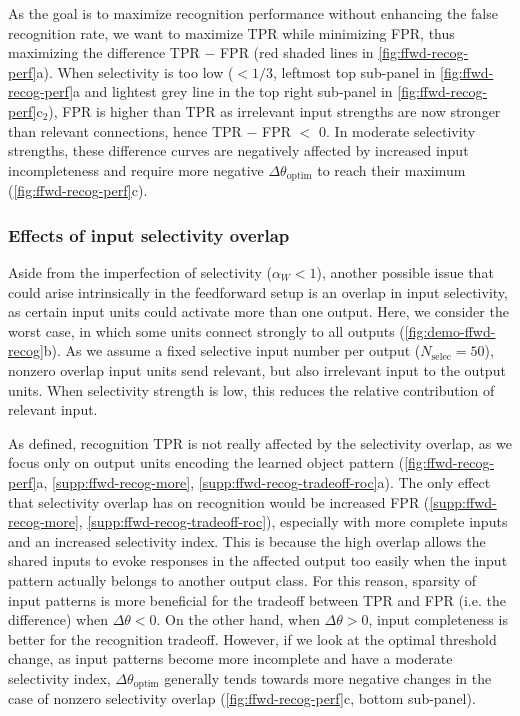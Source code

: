 As the goal is to maximize recognition performance without enhancing the false recognition rate,
        we want to maximize TPR while minimizing FPR,
        thus maximizing the difference TPR $-$ FPR
        (red shaded lines in \autoref{fig:ffwd-recog-perf}a).
    When selectivity is too low
        ($ < 1/3$, leftmost top sub-panel in \autoref{fig:ffwd-recog-perf}a
        and lightest grey line in the top right sub-panel in \autoref{fig:ffwd-recog-perf}c$_2$),
        FPR is higher than TPR as irrelevant input strengths are now stronger than relevant connections,
        hence TPR $-$ FPR $<$ 0.
    In moderate selectivity strengths, these difference curves are negatively affected by increased input incompleteness
        and require more negative $\Delta \theta_{\mathrm{optim}}$ to reach their maximum (\autoref{fig:ffwd-recog-perf}c).

\subsubsection*{Effects of input selectivity overlap}

Aside from the imperfection of selectivity ($\alpha_W < 1$),
        another possible issue that could arise intrinsically in the feedforward setup is
        an overlap in input selectivity, as certain input units could activate more than one output.
    Here, we consider the worst case, in which some units connect strongly to all outputs (\autoref{fig:demo-ffwd-recog}b).
    As we assume a fixed selective input number per output ($N_{\text{selec}} = 50$),
        nonzero overlap input units send relevant,
        but also irrelevant input to the output units.
    When selectivity strength is low, this reduces the relative contribution of relevant input.

As defined, recognition TPR is not really affected by the selectivity overlap,
        as we focus only on output units encoding the learned object pattern
        (\autoref{fig:ffwd-recog-perf}a,
        \autoref{supp:ffwd-recog-more},
        \autoref{supp:ffwd-recog-tradeoff-roc}a).
    The only effect that selectivity overlap has on recognition would be increased FPR
        (\autoref{supp:ffwd-recog-more},
        \autoref{supp:ffwd-recog-tradeoff-roc}),
        especially with more complete inputs and an increased selectivity index.
    This is because the high overlap allows the shared inputs
        to evoke responses in the affected output too easily
        when the input pattern actually belongs to another output class.
    For this reason, sparsity of input patterns is more beneficial
        for the tradeoff between TPR and FPR (i.e. the difference) when $\Delta \theta < 0$.
    On the other hand, when $\Delta \theta > 0$, input completeness is better for the recognition tradeoff.
    However, if we look at the optimal threshold change,
        as input patterns become more incomplete and have a moderate selectivity index,
        $\Delta \theta_{\mathrm{optim}}$ generally tends towards more negative changes
        in the case of nonzero selectivity overlap
        (\autoref{fig:ffwd-recog-perf}c, bottom sub-panel).

